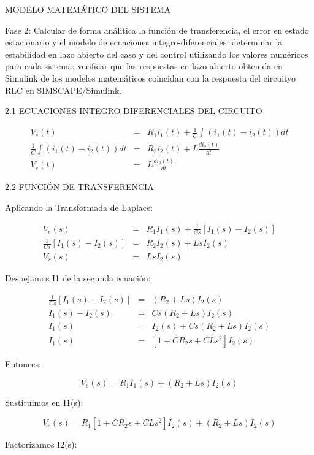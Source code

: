 \documentclass{article}
\begin{document}
MODELO MATEM\'{A}TICO DEL SISTEMA 


Fase 2: Calcular de forma an\'{a}litica la funci\'{o}n de transferencia, el
error en estado estacionario y el modelo de ecuaciones
integro-diferenciales; determinar la estabilidad en lazo abierto del caso y
del control utilizando los valores num\'{e}ricos para cada sistema;
verificar que las respuestas en lazo abierto obtenida en Simulink de los
modelos matem\'{a}ticos coincidan con la respuesta del circuityo RLC en
SIMSCAPE/Simulink. 

\bigskip 

2.1 ECUACIONES INTEGRO-DIFERENCIALES DEL CIRCUITO 

\begin{eqnarray*}
V_{e}(t) &=&R_{1}i_{1}(t)+\frac{1}{C}\int (i_{1}(t)-i_{2}(t))dt \\
\frac{1}{C}\int (i_{1}(t)-i_{2}(t))dt &=&R_{2}i_{2}(t)+L\frac{di_{2}(t)}{dt}
\\
V_{s}(t) &=&L\frac{di_{2}(t)}{dt}
\end{eqnarray*}

2.2 FUNCI\'{O}N DE TRANSFERENCIA 

Aplicando la Transformada de Laplace: 

\begin{eqnarray*}
V_{e}(s) &=&R_{1}I_{1}(s)+\frac{1}{Cs}[I_{1}(s)-I_{2}(s)] \\
\frac{1}{Cs}[I_{1}(s)-I_{2}(s)] &=&R_{2}I_{2}(s)+LsI_{2}(s) \\
V_{s}(s) &=&LsI_{2}(s)
\end{eqnarray*}

Despejamos I1 de la segunda ecuaci\'{o}n: 

\begin{eqnarray*}
\frac{1}{Cs}[I_{1}(s)-I_{2}(s)] &=&(R_{2}+Ls)I_{2}(s) \\
I_{1}(s)-I_{2}(s) &=&Cs(R_{2}+Ls)I_{2}(s) \\
I_{1}(s) &=&I_{2}(s)+Cs(R_{2}+Ls)I_{2}(s) \\
I_{1}(s) &=&[1+CR_{2}s+CLs^{2}]I_{2}(s)
\end{eqnarray*}

\bigskip 

Entonces: 

\[
V_{e}(s)=R_{1}I_{1}(s)+(R_{2}+Ls)I_{2}(s)
\]

Sustituimos en I1(s): 

\[
V_{e}(s)=R_{1}[1+CR_{2}s+CLs^{2}]I_{2}(s)+(R_{2}+Ls)I_{2}(s)
\]

Factorizamos I2(s):
\end{document}
